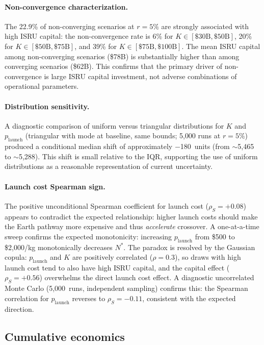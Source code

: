 \documentclass[preprint,12pt]{elsarticle}
\begin{document}
\paragraph{Non-convergence characterization.} The 22.9\% of non-converging scenarios at $r = 5\%$ are strongly associated with high ISRU capital: the non-convergence rate is 6\% for $K \in [\$30\text{B}, \$50\text{B}]$, 20\% for $K \in [\$50\text{B}, \$75\text{B}]$, and 39\% for $K \in [\$75\text{B}, \$100\text{B}]$. The mean ISRU capital among non-converging scenarios (\$78B) is substantially higher than among converging scenarios (\$62B). This confirms that the primary driver of non-convergence is large ISRU capital investment, not adverse combinations of operational parameters.

\paragraph{Distribution sensitivity.} A diagnostic comparison of uniform versus triangular distributions for $K$ and $p_{\mathrm{launch}}$ (triangular with mode at baseline, same bounds; 5{,}000 runs at $r = 5\%$) produced a conditional median shift of approximately $-$180~units (from $\sim$5{,}465 to $\sim$5{,}288). This shift is small relative to the IQR, supporting the use of uniform distributions as a reasonable representation of current uncertainty.

\paragraph{Launch cost Spearman sign.} The positive unconditional Spearman coefficient for launch cost ($\rho_S = +0.08$) appears to contradict the expected relationship: higher launch costs should make the Earth pathway more expensive and thus \emph{accelerate} crossover. A one-at-a-time sweep confirms the expected monotonicity: increasing $p_{\mathrm{launch}}$ from \$500 to \$2{,}000/kg monotonically decreases $N^*$. The paradox is resolved by the Gaussian copula: $p_{\mathrm{launch}}$ and $K$ are positively correlated ($\rho = 0.3$), so draws with high launch cost tend to also have high ISRU capital, and the capital effect ($\rho_S = +0.56$) overwhelms the direct launch cost effect. A diagnostic uncorrelated Monte Carlo (5{,}000~runs, independent sampling) confirms this: the Spearman correlation for $p_{\mathrm{launch}}$ reverses to $\rho_S = -0.11$, consistent with the expected direction.

\subsection{Cumulative economics}
\end{document}

